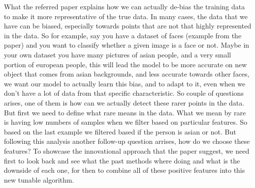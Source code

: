 \documentclass{article}
\begin{document}
What the referred paper explains how we can actually de-bias the training data to make it more representative of the true data. In many cases, the data that we have can be biased, especially towards points that are not that highly represented in the data. So for example, say you have a dataset of faces (example from the paper) and you want to classify whether a given image is a face or not. Maybe in your own dataset you have many pictures of asian people, and a very small portion of european people, this will lead the model to be more accurate on new object that comes from asian backgrounds, and less accurate towards other faces, we want our model to actually learn this bias, and to adapt to it, even when we don't have a lot of data from that specific characteristic. So couple of questions arises, one of them is how can we actually detect these rarer points in the data. But first we need to define what rare means in the data. What we mean by rare is having low numbers of samples when we filter based on particular features. So based on the last example we filtered based if the person is asian or not. But following this analysis another follow-up question arrises, how do we choose these features? To showcase the innovational approach that the paper suggest, we need first to look back and see what the past methods where doing and what is the downside of each one, for then to combine all of these positive features into this new tunable algorithm. 
\end{document}
